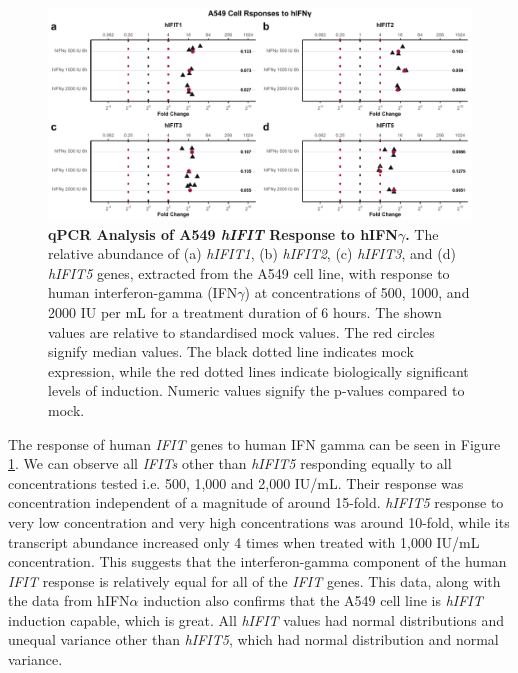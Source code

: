 \begin{figure}
    \centering
    \includegraphics[width=1\linewidth]{06. Chapter 1/Figs/01. Induction/02. a549_treat_ifng.pdf}
    \caption[qPCR Analysis of A549 \textit{hIFIT} Response to hIFN\(\gamma\).]{\textbf{qPCR Analysis of A549 \textit{hIFIT} Response to hIFN\(\gamma\).} The relative abundance of (a) \textit{hIFIT1}, (b) \textit{hIFIT2}, (c) \textit{hIFIT3}, and (d) \textit{hIFIT5} genes, extracted from the A549 cell line, with response to human interferon-gamma (IFN\(\gamma\)) at concentrations of 500, 1000, and 2000 IU per mL for a treatment duration of 6 hours. The shown values are relative to standardised mock values. The red circles signify median values. The black dotted line indicates mock expression, while the red dotted lines indicate biologically significant levels of induction. Numeric values signify the p-values compared to mock.}
    \label{fig:A549 Response to hIFNg}
\end{figure}

The response of human \textit{IFIT} genes to human IFN gamma can be seen in Figure \ref{fig:A549 Response to hIFNg}. We can observe all \textit{IFITs} other than \textit{hIFIT5} responding equally to all concentrations tested i.e. 500, 1,000 and 2,000 IU/mL. Their response was concentration independent of a magnitude of around 15-fold. \textit{hIFIT5} response to very low concentration and very high concentrations was around 10-fold, while its transcript abundance increased only 4 times when treated with 1,000 IU/mL concentration. This suggests that the interferon-gamma component of the human \textit{IFIT} response is relatively equal for all of the \textit{IFIT} genes. This data, along with the data from hIFN\(\alpha\) induction also confirms that the A549 cell line is \textit{hIFIT} induction capable, which is great. All \textit{hIFIT} values had normal distributions and unequal variance other than \textit{hIFIT5}, which had normal distribution and normal variance.

